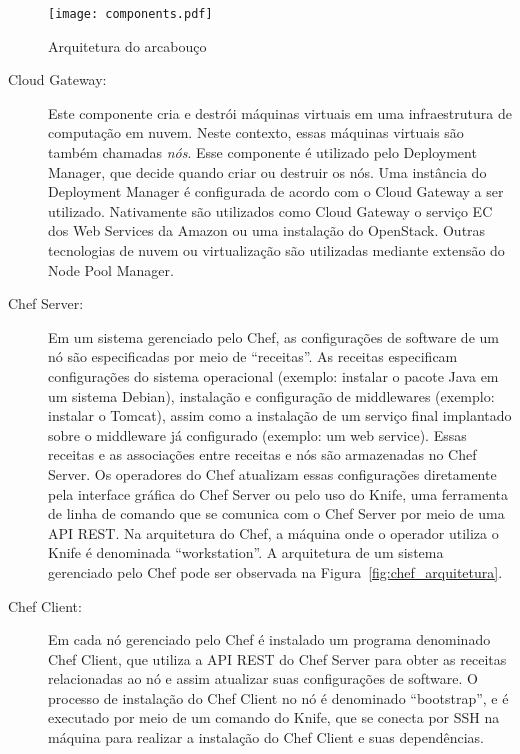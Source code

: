 \begin{figure}[!h]
  \centering
  \texttt{[image: components.pdf]} 
  \caption{Arquitetura do arcabouço \ee}
  \label{fig:ee_componentes} 
\end{figure}

\begin{description}

\item [Cloud Gateway:]

Este componente cria e destrói máquinas virtuais em uma infraestrutura de computação em nuvem. Neste contexto, essas máquinas virtuais são também chamadas \emph{nós}. Esse componente é utilizado pelo Deployment Manager, que decide quando criar ou destruir os nós. Uma instância do Deployment Manager é configurada de acordo com o Cloud Gateway a ser utilizado. Nativamente são utilizados como Cloud Gateway o serviço EC dos Web Services da Amazon ou uma instalação do OpenStack. Outras tecnologias de nuvem ou virtualização são utilizadas mediante extensão do Node Pool Manager.

\item [Chef Server:]

Em um sistema gerenciado pelo Chef, as configurações de software de um nó são especificadas por meio de ``receitas''. As receitas especificam configurações do sistema operacional (exemplo: instalar o pacote Java em um sistema Debian), instalação e configuração de middlewares (exemplo: instalar o Tomcat), assim como a instalação de um serviço final implantado sobre o middleware já configurado (exemplo: um web service). Essas receitas e as associações entre receitas e nós são armazenadas no Chef Server. Os operadores do Chef atualizam essas configurações diretamente pela interface gráfica do Chef Server ou pelo uso do Knife, uma ferramenta de linha de comando que se comunica com o Chef Server por meio de uma API REST. Na arquitetura do Chef, a máquina onde o operador utiliza o Knife é denominada ``workstation''. A arquitetura de um sistema gerenciado pelo Chef pode ser observada na Figura~\ref{fig:chef_arquitetura}.

\item [Chef Client:]

Em cada nó gerenciado pelo Chef é instalado um programa denominado Chef Client, que utiliza a API REST do Chef Server para obter as receitas relacionadas ao nó e assim atualizar suas configurações de software. O processo de instalação do Chef Client no nó é denominado ``bootstrap'', e é executado por meio de um comando do Knife, que se conecta por SSH na máquina para realizar a instalação do Chef Client e suas dependências.


\end{description}

